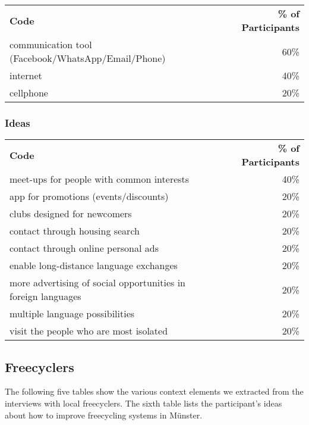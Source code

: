 \begin{longtable}{p{}r}
\textbf{Code}                                      & \textbf{\% of Participants} \\
communication tool (Facebook/WhatsApp/Email/Phone) & 60\%                        \\
internet                                           & 40\%                        \\
cellphone                                          & 20\%
\end{longtable}

\subsubsection*{Ideas}

\begin{longtable}{p{}r}
\textbf{Code}                                                 & \textbf{\% of Participants} \\
meet-ups for people with common interests                     & 40\%                        \\
app for promotions (events/discounts)                         & 20\%                        \\
clubs designed for newcomers                                  & 20\%                        \\
contact through housing search                                & 20\%                        \\
contact through online personal ads                           & 20\%                        \\
enable long-distance language exchanges                       & 20\%                        \\
more advertising of social opportunities in foreign languages & 20\%                        \\
multiple language possibilities                               & 20\%                        \\
visit the people who are most isolated                        & 20\%
\end{longtable}




\subsection{Freecyclers}

The following five tables show the various context elements we extracted from the interviews with local freecyclers. The sixth table lists the participant's ideas about how to improve freecycling systems in Münster.

